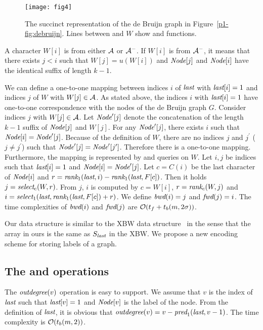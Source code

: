 \begin{figure}[bt]
\begin{center}
  \texttt{[image: fig4]}
\caption{The succinct representation of the de Bruijn graph in Figure~\ref{p1-fig:debruijn}.
Lines between {\Node} and $W$ show {\fwd} and {\bwd} functions.
}
\label{p1-fig:succinctdebruijn}
\end{center}
\end{figure}


A character $W[i]$ is from either ${\cal A}$ or ${\cal A}^-$.
If $W[i]$ is from ${\cal A}^-$, it means that there exists $j < i$ such that
$W[j] = u(W[i])$ and ${\textit{Node}}[j]$ and ${\textit{Node}}[i]$ have the identical suffix of length $k-1$.

We can define a one-to-one mapping between indices $i$ of ${\textit{last}}$ with ${\textit{last}}[i] = 1$
and indices $j$ of $W$ with $W[j] \in {\cal A}$.
As stated above, the indices $i$ with ${\textit{last}}[i] = 1$ have one-to-one correspondence with
the nodes of the de Bruijn graph $G$.  Consider indices $j$ with $W[j] \in {\cal A}$.
Let ${\textit{Node}}^\prime[j]$ denote
the concatenation of the length $k-1$ suffix of ${\textit{Node}}[j]$ and $W[j]$.
For any ${\textit{Node}}^\prime[j]$, there exists $i$ such that ${\textit{Node}}[i] = {\textit{Node}}^\prime[j]$.
Because of the definition of $W$, there are no indices $j$ and $j^\prime$ 
($j \neq j^\prime$) such that ${\textit{Node}}^\prime[j] = {\textit{Node}}^\prime[j^\prime]$.
Therefore there is a one-to-one mapping.  Furthermore, the mapping is represented by
{\rank} and {\select} queries on $W$.
Let $i,j$ be indices such that ${\textit{last}}[i] = 1$ and ${\textit{Node}}[i] = {\textit{Node}}^\prime[j]$.
Let $c = C(i)$ be the last character of ${\textit{Node}}[i]$ and 
$r = {\textit{rank}}_1({\textit{last}}, i) - {\textit{rank}}_1({\textit{last}}, F[c])$.
Then it holds $j = {\textit{select}}_c(W, r)$.  
From $j$, $i$ is computed by $c = W[i]$, $r = {\textit{rank}}_c(W, j)$ and
$i = {\textit{select}}_1({\textit{last}}, {\textit{rank}}_1({\textit{last}}, F[c]) + r)$.
We define $\textit{bwd}(i) = j$ and $\textit{fwd}(j) = i$.
The time complexities of $\textit{bwd}(i)$ and $\textit{fwd}(j)$ are
$\mathcal{O}(t_f + t_b(m,2\sigma))$.


Our data structure is similar to the XBW data structure~\cite{FLMM09} in the sense
that the {\last} array in ours is the same as $S_{\textit{last}}$ in the XBW.
We propose a new encoding scheme for storing labels of a graph.


\subsection{The {\cdeg} and {\child} operations}
The ${\textit{outdegree}}(v)$ operation is easy to support.
We assume that $v$ is the index of ${\textit{last}}$ such that ${\textit{last}}[v] = 1$ and
${\textit{Node}}[v]$ is the label of the node.
From the definition of ${\textit{last}}$, it is obvious that 
${\textit{outdegree}}(v) = v - {\textit{pred}}_1({\textit{last}}, v-1)$.
The time complexity is $\mathcal{O}(t_b(m,2))$.

